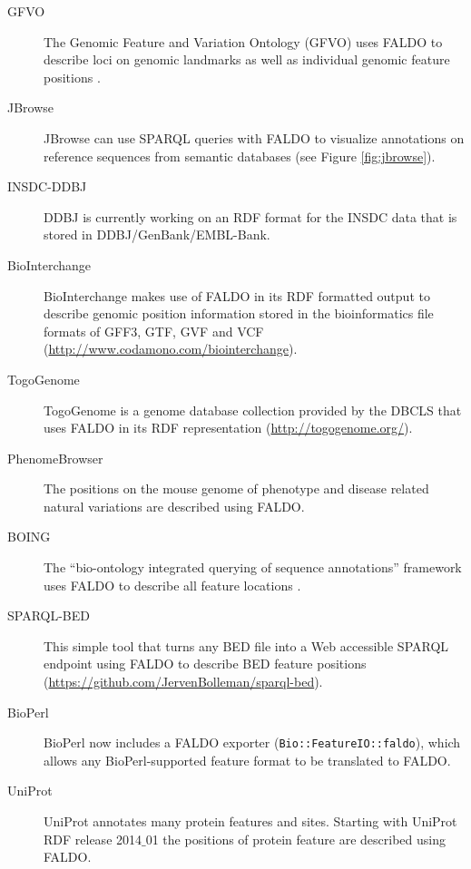 \begin{description}
\item[GFVO] The Genomic Feature and Variation Ontology (GFVO) uses FALDO to describe loci on genomic landmarks as well as individual genomic feature positions \cite{GFVO}.
\item[JBrowse] JBrowse can use SPARQL queries with FALDO to visualize annotations on reference sequences from semantic databases \cite{JBrowse} (see Figure \ref{fig:jbrowse}).
\item[INSDC-DDBJ] DDBJ is currently working on an RDF format for the INSDC data that is stored in DDBJ/GenBank/EMBL-Bank.
\item[BioInterchange] BioInterchange makes use of FALDO in its RDF formatted output to describe genomic position information stored in the bioinformatics file formats of GFF3, GTF, GVF and VCF (\url{http://www.codamono.com/biointerchange}).
\item[TogoGenome] TogoGenome is a genome database collection provided by the DBCLS that uses FALDO in its RDF representation (\url{http://togogenome.org/}).
\item[PhenomeBrowser] The positions on the mouse genome of phenotype and disease related natural variations are described using FALDO.
\item[BOING] The ``bio-ontology integrated querying of sequence annotations'' framework uses FALDO to describe all feature locations \cite{BOING}.
\item[SPARQL-BED] This simple tool that turns any BED file into a Web accessible SPARQL endpoint using FALDO to describe BED feature positions (\url{https://github.com/JervenBolleman/sparql-bed}).
\item[BioPerl] BioPerl\cite{BioPerl2002} now includes a FALDO exporter (\texttt{Bio::FeatureIO::faldo}), which allows any BioPerl-supported feature format to be translated to FALDO.
\item[UniProt] UniProt annotates many protein features and sites. Starting with UniProt RDF release 2014$\_$01 the positions of protein feature are described using FALDO.
\end{description}

